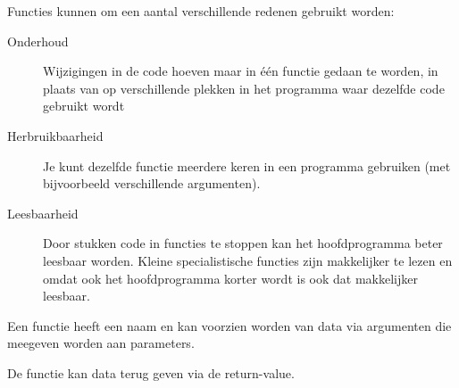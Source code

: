 Functies kunnen om een aantal verschillende redenen gebruikt worden:
\begin{description}
\item [Onderhoud] Wijzigingen in de code hoeven maar in \'e\'en functie gedaan te worden, in plaats van op verschillende plekken in het programma waar dezelfde code gebruikt wordt
\item [Herbruikbaarheid] Je kunt dezelfde functie meerdere keren in een programma gebruiken (met bijvoorbeeld verschillende argumenten).
\item [Leesbaarheid] Door stukken code in functies te stoppen kan het hoofdprogramma beter leesbaar worden. Kleine specialistische functies zijn makkelijker te lezen en omdat ook het hoofdprogramma korter wordt is ook dat makkelijker leesbaar.
\end{description}

Een functie heeft een naam en kan voorzien worden van data via argumenten die meegeven worden aan parameters.

De functie kan data terug geven via de return-value.

